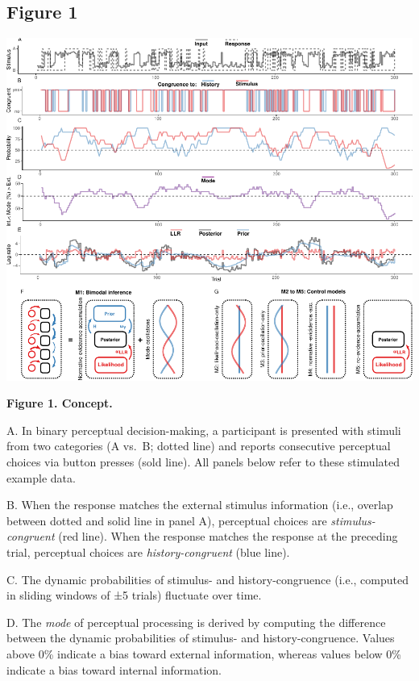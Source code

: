 \documentclass[
]{article}
\begin{document}
\hypertarget{figure-1}{%
\subsection{Figure 1}\label{figure-1}}

\includegraphics{modes_mouse_rev1b_clean_files/figure-latex/revised_Figure_1-1.pdf}

\textbf{Figure 1. Concept.}

A. In binary perceptual decision-making, a participant is presented with
stimuli from two categories (A vs.~B; dotted line) and reports
consecutive perceptual choices via button presses (sold line). All
panels below refer to these stimulated example data.

B. When the response matches the external stimulus information (i.e.,
overlap between dotted and solid line in panel A), perceptual choices
are \emph{stimulus-congruent} (red line). When the response matches the
response at the preceding trial, perceptual choices are
\emph{history-congruent} (blue line).

C. The dynamic probabilities of stimulus- and history-congruence (i.e.,
computed in sliding windows of ±5 trials) fluctuate over time.

D. The \emph{mode} of perceptual processing is derived by computing the
difference between the dynamic probabilities of stimulus- and
history-congruence. Values above 0\% indicate a bias toward external
information, whereas values below 0\% indicate a bias toward internal
information.
\end{document}
